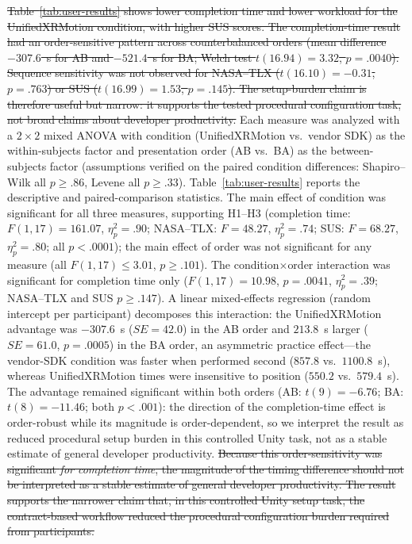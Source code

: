 \documentclass[runningheads]{llncs}
\newcommand{\radd}[1]{\textcolor{revadd}{#1}}
\newcommand{\rdel}[1]{\textcolor{revdel}{\sout{#1}}}
\newcommand{\radd}[1]{#1}
\newcommand{\rdel}[1]{}
\begin{document}
\rdel{Table~\ref{tab:user-results} shows lower completion time and lower workload for the UnifiedXRMotion condition, with higher SUS scores. The completion-time result had an order-sensitive pattern across counterbalanced orders (mean difference $-307.6$~s for AB and $-521.4$~s for BA; Welch test $t(16.94)=3.32$, $p=.0040$). Sequence sensitivity was not observed for NASA--TLX ($t(16.10)=-0.31$, $p=.763$) or SUS ($t(16.99)=1.53$, $p=.145$). The setup-burden claim is therefore useful but narrow: it supports the tested procedural configuration task, not broad claims about developer productivity.}
\radd{Each measure was analyzed with a $2\times2$ mixed ANOVA with condition (UnifiedXRMotion vs.\ vendor SDK) as the within-subjects factor and presentation order (AB vs.\ BA) as the between-subjects factor (assumptions verified on the paired condition differences: Shapiro--Wilk all $p\ge.86$, Levene all $p\ge.33$). Table~\ref{tab:user-results} reports the descriptive and paired-comparison statistics. The main effect of condition was significant for all three measures, supporting H1--H3 (completion time: $F(1,17)=161.07$, $\eta_p^2=.90$; NASA--TLX: $F=48.27$, $\eta_p^2=.74$; SUS: $F=68.27$, $\eta_p^2=.80$; all $p<.0001$); the main effect of order was not significant for any measure (all $F(1,17)\le3.01$, $p\ge.101$). The condition$\times$order interaction was significant for completion time only ($F(1,17)=10.98$, $p=.0041$, $\eta_p^2=.39$; NASA--TLX and SUS $p\ge.147$). A linear mixed-effects regression (random intercept per participant) decomposes this interaction: the UnifiedXRMotion advantage was $-307.6$~s ($SE=42.0$) in the AB order and $213.8$~s larger ($SE=61.0$, $p=.0005$) in the BA order, an asymmetric practice effect---the vendor-SDK condition was faster when performed second ($857.8$ vs.\ $1100.8$~s), whereas UnifiedXRMotion times were insensitive to position ($550.2$ vs.\ $579.4$~s). The advantage remained significant within both orders (AB: $t(9)=-6.76$; BA: $t(8)=-11.46$; both $p<.001$): the direction of the completion-time effect is order-robust while its magnitude is order-dependent, so we interpret the result as reduced procedural setup burden in this controlled Unity task, not as a stable estimate of general developer productivity.}
\rdel{Because this order-sensitivity was significant \emph{for completion time}, the magnitude of the timing difference should not be interpreted as a stable estimate of general developer productivity. The result supports the narrower claim that, in this controlled Unity setup task, the contract-based workflow reduced the procedural configuration burden required from participants.}
\end{document}
